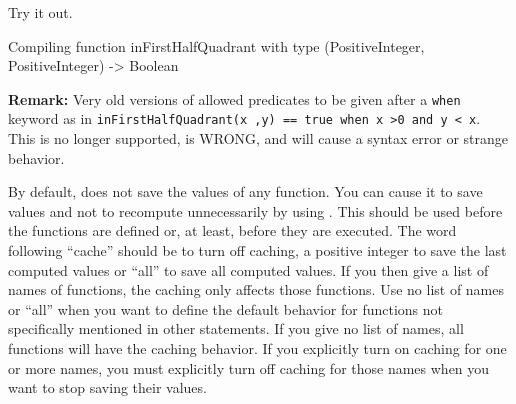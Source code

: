 \begin{xtc}
\begin{xtccomment}
Try it out.
\end{xtccomment}
\begin{spadsrc}
\end{spadsrc}
\begin{MessageOutput}
   Compiling function inFirstHalfQuadrant with type (PositiveInteger,
      PositiveInteger) -> Boolean 
\end{MessageOutput}
\begin{TeXOutput}
\begin{fricasmath}{8}
%
\end{fricasmath}
\end{TeXOutput}
\end{xtc}

{\bf Remark:} Very old versions of \Language{} allowed predicates
to be given after a {\tt when} keyword as in
{\tt inFirstHalfQuadrant(x ,y) == true when x >0 and y < x}.
This is no longer supported, is WRONG, and will cause a syntax
error or strange behavior.


By default, \Language{} does not save the values of any function.
You can cause it to save values and not to recompute unnecessarily
by using .
This should be used before the functions are defined or, at least, before
they are executed.
The word following ``cache'' should be  to turn off
caching, a positive integer  to save the last 
computed values or ``all'' to save all computed values.
If you then give a list of names of functions, the caching
only affects those functions.
Use no list of names or ``all'' when you want to define the default
behavior for functions not specifically mentioned in other
 statements.
If you give no list of names, all functions will have the caching behavior.
If you explicitly turn on caching for one or more names, you must
explicitly turn off caching for those names when you want to stop
saving their values.

